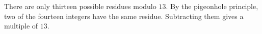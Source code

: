 There are only thirteen possible residues modulo $ 13 $. By the pigeonhole principle, two of the fourteen integers have the same residue. Subtracting them gives a multiple of $ 13 $.
